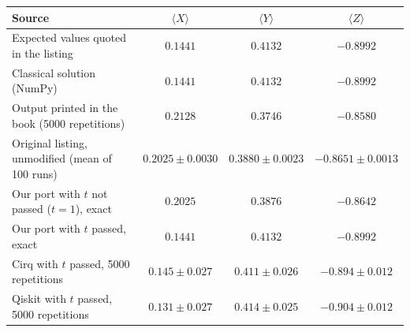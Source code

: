 \begin{tabular}{lccc}
\toprule
Source & $\langle X\rangle$ & $\langle Y\rangle$ & $\langle Z\rangle$ \\
\midrule
Expected values quoted in the listing & $0.1441$ & $0.4132$ & $-0.8992$ \\
Classical solution (NumPy) & $0.1441$ & $0.4132$ & $-0.8992$ \\
\midrule
Output printed in the book (5000 repetitions) & $0.2128$ & $0.3746$ & $-0.8580$ \\
Original listing, unmodified (mean of 100 runs) & $0.2025 \pm 0.0030$ & $0.3880 \pm 0.0023$ & $-0.8651 \pm 0.0013$ \\
Our port with $t$ not passed ($t=1$), exact & $0.2025$ & $0.3876$ & $-0.8642$ \\
\midrule
Our port with $t$ passed, exact & $0.1441$ & $0.4132$ & $-0.8992$ \\
Cirq with $t$ passed, 5000 repetitions & $0.145 \pm 0.027$ & $0.411 \pm 0.026$ & $-0.894 \pm 0.012$ \\
Qiskit with $t$ passed, 5000 repetitions & $0.131 \pm 0.027$ & $0.414 \pm 0.025$ & $-0.904 \pm 0.012$ \\
\bottomrule
\end{tabular}

